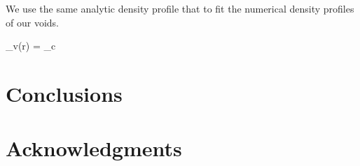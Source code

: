 \documentclass[a4,useAMS,usenatbib,usegraphicx]{latex/mn2e}
\begin{document}
We use the same analytic density profile that \SRKED{[Hamaous, et.al 2014]} 
to fit the numerical density profiles of our voids.


{
\delta_v(r) = \delta_c
}



\section{Conclusions}
\label{sec:conclusions}


\section*{Acknowledgments}  



 
\end{document}
